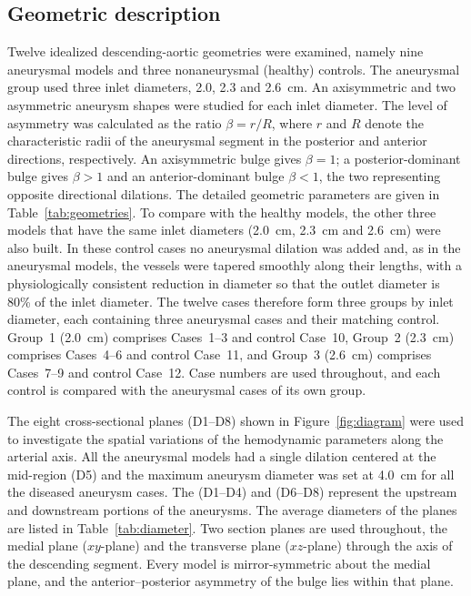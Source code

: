\documentclass[12pt,a4paper]{article}
\theoremstyle{definition}
\numberwithin{equation}{section}
\begin{document}
\subsection{\label{Geometric Description}Geometric description}
Twelve idealized descending-aortic geometries were examined, namely nine aneurysmal models and three nonaneurysmal (healthy) controls. The aneurysmal group used three inlet diameters, 2.0, 2.3 and 2.6~cm. An axisymmetric and two asymmetric aneurysm shapes were studied for each inlet diameter. The level of asymmetry was calculated as the ratio $\beta = r/R$, where $r$ and $R$ denote the characteristic radii of the aneurysmal segment in the posterior and anterior directions, respectively. An axisymmetric bulge gives $\beta = 1$; {a} posterior-dominant bulge gives $\beta > 1$ and {an} anterior-dominant bulge $\beta < 1$, the two representing opposite directional dilations. The detailed geometric parameters are given in Table~\ref{tab:geometries}. To compare with the healthy models, the other three models that have the same inlet diameters (2.0~cm, 2.3~cm and 2.6~cm) were also built. In these control cases no aneurysmal dilation was added and, as in the aneurysmal models, the vessels were tapered smoothly along their lengths, with a physiologically consistent reduction in diameter so that the outlet diameter is 80\% of the inlet diameter. The twelve cases therefore form three groups by inlet diameter, each containing three aneurysmal cases and their matching control. Group~1 (2.0~cm) comprises Cases~1--3 and control Case~10, Group~2 (2.3~cm) comprises Cases~4--6 and control Case~11, and Group~3 (2.6~cm) comprises Cases~7--9 and control Case~12. Case numbers are used throughout, and each control is compared with the aneurysmal cases of its own group.

The eight cross-sectional planes (D1--D8) shown in Figure~\ref{fig:diagram} were used to investigate the spatial variations of the hemodynamic parameters along the arterial axis. All the aneurysmal models had a single dilation centered at the mid-region (D5) and the maximum aneurysm diameter was set at 4.0~cm for all the diseased aneurysm cases. The (D1--D4) and (D6--D8) represent the upstream and downstream portions of the aneurysms. The average diameters of the planes are listed in Table~\ref{tab:diameter}. Two section planes are used throughout, the medial plane ($xy$-plane) and the transverse plane ($xz$-plane) through the axis of the descending segment. Every model is mirror-symmetric about the medial plane, and the anterior--posterior asymmetry of the bulge lies within that plane.
\end{document}
